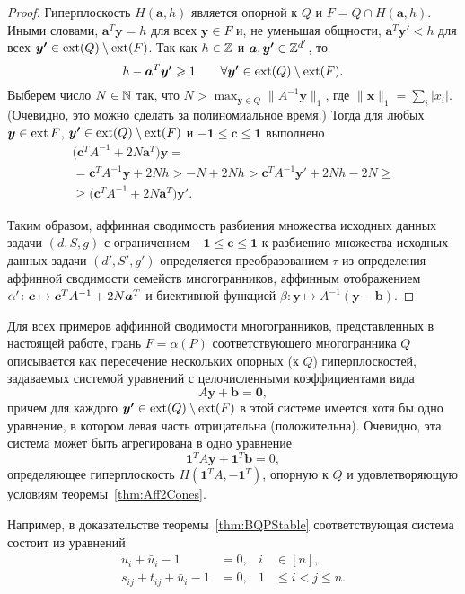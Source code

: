 \begin{proof}
Гиперплоскость \(H(\bm{a}, h)\) является опорной к $Q$ и $F = Q \cap H(\bm{a}, h)$. Иными словами, $\bm{a}^T\bm{y} = h$ для всех $\bm{y} \in F$ и, не уменьшая общности, $\bm{a}^T\bm{y'} < h$ для всех $\bm{y'} \in \operatorname{ext}(Q) \setminus \operatorname{ext}(F)$.
Так как $h \in \mathbb{Z}$ и $\bm{a},\bm{y'} \in \mathbb{Z}^{d'}$, то
\[
h - \bm{a}^T\bm{y'} \geqslant 1 \qquad \forall \bm{y'} \in \operatorname{ext}(Q) \setminus \operatorname{ext}(F).
\]
Выберем число $N \in \mathbb{N}$ так, что $N > \max_{\bm{y}\in Q} \|A^{-1} \bm{y}\|_1$, где $\|\bm{x}\|_1 = \sum_{i} |x_{i}|$. (Очевидно, это можно сделать за полиномиальное время.)
Тогда для любых $\bm{y} \in \operatorname{ext}{F}$, $\bm{y'} \in \operatorname{ext}(Q) \setminus \operatorname{ext}(F)$ и $\bm{-1} \le \bm{c} \le \bm{1}$ выполнено
\begin{multline*}
\bigl(\bm{c}^T A^{-1} + 2N \bm{a}^T\bigr) \bm{y} =\\
= \bm{c}^T A^{-1} \bm{y} + 2Nh > -N + 2Nh > \bm{c}^T A^{-1} \bm{y'} + 2Nh - 2N \ge\\
\ge \bigl(\bm{c}^T A^{-1} + 2N \bm{a}^T\bigr)\bm{y'}.
\end{multline*}

Таким образом, аффинная сводимость разбиения множества исходных данных задачи $(d,S,g)$ с ограничением $\bm{-1} \le \bm{c} \le \bm{1}$ к разбиению множества исходных данных задачи $(d',S',g')$ определяется преобразованием $\tau$ из определения аффинной сводимости семейств многогранников, аффинным отображением \(\alpha'\colon \bm{c} \mapsto \bm{c}^T A^{-1} + 2N \bm{a}^T\) и биективной функцией $\beta: \bm{y} \mapsto A^{-1}(\bm{y} - \bm{b})$.
\end{proof}

\begin{remark}
Для всех примеров аффинной сводимости многогранников, представленных в настоящей работе, грань $F = \alpha(P)$ соответствующего многогранника $Q$ описывается как пересечение нескольких опорных (к $Q$) гиперплоскостей, задаваемых системой уравнений с целочисленными коэффициентами вида
\begin{equation*}
A \bm{y} + \bm{b} = \bm{0},
\end{equation*}
причем для каждого $\bm{y'} \in \operatorname{ext}(Q) \setminus \operatorname{ext}(F)$ в этой системе имеется хотя бы одно уравнение, в котором левая часть отрицательна (положительна).
Очевидно, эта система может быть агрегирована в одно уравнение
\[
\bm{1}^T A \bm{y} + \bm{1}^T \bm{b} = 0,
\]
определяющее гиперплоскость $H(\bm{1}^T A, -\bm{1}^T)$, опорную к $Q$ и удовлетворяющую условиям теоремы~\ref{thm:Aff2Cones}.

Например, в доказательстве теоремы~\ref{thm:BQPStable} соответствующая система состоит из уравнений
\[
\begin{aligned}
u_i   + \bar{u}_i  - 1 & = 0,          & i &\in [n],\\
s_{ij} + t_{ij} + \bar{u}_i - 1 & = 0, & 1 &\le i < j \le n.
\end{aligned}
\]
\end{remark}


%
%
